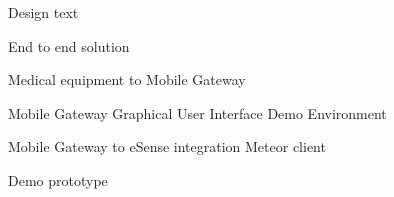 Design text

End to end solution

Medical equipment to Mobile Gateway

Mobile Gateway Graphical User Interface
Demo Environment

Mobile Gateway to eSense integration
Meteor client

Demo prototype
